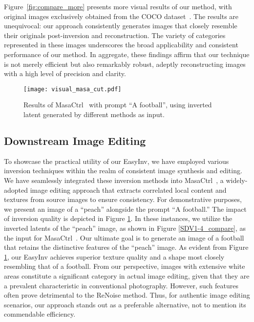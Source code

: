 \documentclass[letterpaper]{article} \usepackage{aaai25}  \usepackage{times}  \usepackage{helvet}  \usepackage{courier}  \usepackage[hyphens]{url}  \usepackage{graphicx} \urlstyle{rm} \def\UrlFont{\rm}  \usepackage{natbib}  \usepackage{caption} \frenchspacing  \setlength{\pdfpagewidth}{8.5in} \setlength{\pdfpageheight}{11in} \usepackage{algorithm}
\begin{document}
Figure~\ref{fig:compare_more} presents more visual results of our method, with original images exclusively obtained from the COCO dataset~\cite{COCO}. The results are unequivocal: our approach consistently generates images that closely resemble their originals post-inversion and reconstruction. The variety of categories represented in these images underscores the broad applicability and consistent performance of our method. In aggregate, these findings affirm that our technique is not merely efficient but also remarkably robust, adeptly reconstructing images with a high level of precision and clarity.


\begin{figure}[!t]
    \centering
    \texttt{[image: visual\_masa\_cut.pdf]}
    \caption{Results of MasaCtrl~\cite{cao_2023_masactrl} with prompt ``A football'', using inverted latent generated by different methods as input.}
    \label{masa_compare}
\end{figure}



\subsection{Downstream Image Editing}
To showcase the practical utility of our EasyInv, we have employed various inversion techniques within the realm of consistent image synthesis and editing. We have seamlessly integrated these inversion methods into MasaCtrl~\cite{cao_2023_masactrl}, a widely-adopted image editing approach that extracts correlated local content and textures from source images to ensure consistency. For demonstrative purposes, we present an image of a ``peach'' alongside the prompt ``A football.'' The impact of inversion quality is depicted in Figure \ref{masa_compare}. In these instances, we utilize the inverted latents of the ``peach'' image, as shown in Figure \ref{SDV1-4_compare}, as the input for MasaCtrl~\cite{cao_2023_masactrl}. Our ultimate goal is to generate an image of a football that retains the distinctive features of the ``peach'' image. As evident from Figure \ref{masa_compare}, our EasyInv achieves superior texture quality and a shape most closely resembling that of a football. From our perspective, images with extensive white areas constitute a significant category in actual image editing, given that they are a prevalent characteristic in conventional photography. However, such features often prove detrimental to the ReNoise method. Thus, for authentic image editing scenarios, our approach stands out as a preferable alternative, not to mention its commendable efficiency.
\end{document}
